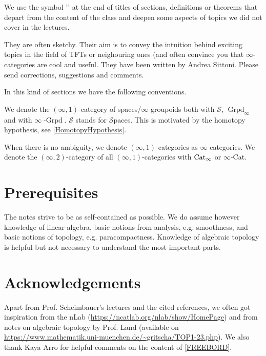 \begin{notat}[\extra]
    We use the symbol '\extra' at the end of titles of sections, definitions or theorems that depart from the
    content of the class and deepen some aspects of topics we did not cover in the lectures.
    
    They are often sketchy. Their aim is to convey the intuition behind exciting topics in the field of TFTs
     or neighouring ones (and often
    convince you that $\infty$-categories are cool and useful. They have been written by Andrea Sittoni.
    Please send corrections, suggestions and comments.
\end{notat}
In this kind of sections we have the following conventions.
\begin{notat}
We denote the $(\infty,1)$-category of spaces/$\infty$-groupoids both with $\mathscr{S}$,
 $\operatorname{Grpd}_\infty$ and with $\infty\operatorname{-Grpd}$. $\mathscr{S}$ stands for 
 $\mathscr{S}$paces. This is motivated by the
  homotopy hypothesis, see \ref{HomotopyHypothesis}.
\end{notat}
\begin{notat}
When there is no ambiguity, we denote $(\infty,1)$-categories as $\infty$-categories. We denote the
$(\infty,2)$-category of all $(\infty,1)$-categories with $\operatorname{Cat}_\infty$ or $\infty$-Cat.
\end{notat}
\section*{Prerequisites}
The notes strive to be as self-contained as possible. We do assume however knowledge of linear algebra,
basic notions from analysis, e.g. smoothness, and basic notions of topology, e.g. 
paracompactness. Knowledge of algebraic topology is helpful but not necessary to understand the
most important parts.
\section*{Acknowledgements}
Apart from Prof. Scheimbauer's lectures and the cited references,
we often got inspiration from the nLab (\url{https://ncatlab.org/nlab/show/HomePage}) and from notes
on algebraic topology by Prof. Land (available on \url{https://www.mathematik.uni-muenchen.de/~gritscha/TOP1-23.php}).
We also thank Kaya Arro for helpful comments on the content of \ref{FREEBORD}.
\thispagestyle{empty}
\hfill
\vspace{0.50cm}
\textcolor{black}{\tableofcontents}